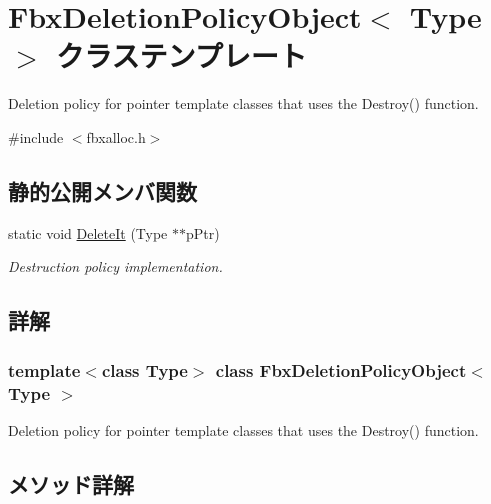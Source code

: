 \hypertarget{class_fbx_deletion_policy_object}{}\section{Fbx\+Deletion\+Policy\+Object$<$ Type $>$ クラステンプレート}
\label{class_fbx_deletion_policy_object}


Deletion policy for pointer template classes that uses the Destroy() function.  




{\ttfamily \#include $<$fbxalloc.\+h$>$}

\subsection*{静的公開メンバ関数}
\begin{DoxyCompactItemize}
\item 
static void \hyperlink{class_fbx_deletion_policy_object_a5a0e0ae55b3f3fb5f195e777facf6d1c}{Delete\+It} (Type $\ast$$\ast$p\+Ptr)
\begin{DoxyCompactList}\small\item\em Destruction policy implementation. \end{DoxyCompactList}\end{DoxyCompactItemize}


\subsection{詳解}
\subsubsection*{template$<$class Type$>$\newline
class Fbx\+Deletion\+Policy\+Object$<$ Type $>$}

Deletion policy for pointer template classes that uses the Destroy() function. 

\subsection{メソッド詳解}
\mbox{\label{class_fbx_deletion_policy_object_a5a0e0ae55b3f3fb5f195e777facf6d1c}} 
